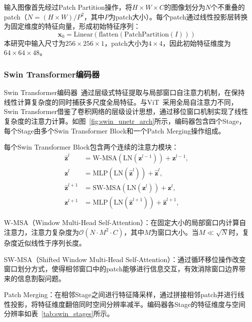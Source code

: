 \documentclass[12pt, a4paper]{article}
\newcommand{\mrm}[1]{\mathrm{#1}}
\begin{document}
输入图像首先经过Patch Partition操作，将$H{\times}W{\times}C$的图像划分为$N$个不重叠的patch（$N=(H{\times}W)/P^2$，其中$P$为patch大小）。每个patch通过线性投影层转换为固定维度的特征向量，形成初始特征序列：
\begin{equation}
    \bm{x}_0 = \mrm{Linear}(\text{flatten}(\text{PatchPartition}(I)))
\end{equation}
本研究中输入尺寸为$256{\times}256{\times}1$，patch大小为$4{\times}4$，因此初始特征维度为$64{\times}64{\times}48$。

\subsubsection{Swin Transformer编码器}

Swin Transformer编码器~\cite{liu2021swin}通过层级式特征提取与局部窗口自注意力机制，在保持线性计算复杂度的同时捕获多尺度全局特征。与ViT~\cite{dosovitskiy2021vit}采用全局自注意力不同，Swin Transformer借鉴了卷积网络的层级设计思想，通过移位窗口机制实现了线性复杂度的注意力计算。如图~\ref{fig:swin_unetr_arch}所示，编码器包含四个Stage，每个Stage由多个Swin Transformer Block和一个Patch Merging操作组成。

每个Swin Transformer Block包含两个连续的注意力模块：
\begin{align}
    \hat{\bm{z}}^{l} &= \mrm{W\text{-}MSA}\!\left(\mrm{LN}\!\left(\bm{z}^{l-1}\right)\right) + \bm{z}^{l-1}, \\
    \bm{z}^{l} &= \mrm{MLP}\!\left(\mrm{LN}\!\left(\hat{\bm{z}}^{l}\right)\right) + \hat{\bm{z}}^{l}, \\
    \hat{\bm{z}}^{l+1} &= \mrm{SW\text{-}MSA}\!\left(\mrm{LN}\!\left(\bm{z}^{l}\right)\right) + \bm{z}^{l}, \\
    \bm{z}^{l+1} &= \mrm{MLP}\!\left(\mrm{LN}\!\left(\hat{\bm{z}}^{l+1}\right)\right) + \hat{\bm{z}}^{l+1},
\end{align}

W-MSA（Window Multi-Head Self-Attention）：在固定大小的局部窗口内计算自注意力，注意力复杂度为$\mathcal{O}(N \cdot M^2 \cdot C)$，其中$M$为窗口大小。当$M \ll \sqrt{N}$时，复杂度近似线性于序列长度。

SW-MSA（Shifted Window Multi-Head Self-Attention）：通过循环移位操作改变窗口划分方式，使得相邻窗口中的patch能够进行信息交互，有效消除窗口边界带来的信息割裂问题。

Patch Merging：在相邻Stage之间进行特征降采样，通过拼接相邻patch并进行线性投影，将特征维度翻倍同时空间分辨率减半。编码器各Stage的特征维度与空间分辨率如表~\ref{tab:swin_stages}所示。
\end{document}
